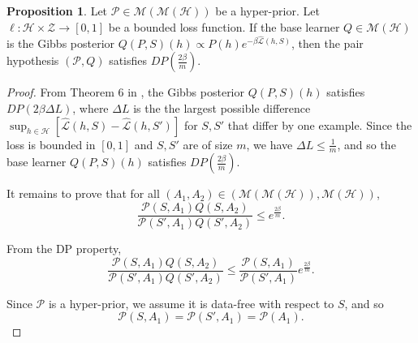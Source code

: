 \documentclass{article} %
\theoremstyle{definition}
\newtheorem{proposition}[theorem]{Proposition}
\begin{document}
\begin{proposition} \label{thm:pair-is-dp-appendix}
	Let $\mathcal{P}\in \mathcal{M}(\mathcal{M}(\mathcal{H}))$ be a hyper-prior.
	Let $\ell:\mathcal{H}\times \mathcal{Z}\rightarrow [0,1]$ be a bounded loss function. If the base learner $Q\in \mathcal{M}(\mathcal{H})$ is the Gibbs posterior $Q(P, S)(h)\propto P(h)e^{-\beta\hat{\mathcal{L}}(h, S)}$, 
	then the pair hypothesis $(\mathcal{P}, Q)$ satisfies $DP\left (\frac{2\beta}{m}\right )$.
\end{proposition}

\begin{proof}
	From Theorem 6 in \citet{McSherry2007}, the Gibbs posterior $Q(P, S)(h)$ satisfies $DP\left (2\beta\Delta L\right )$, where $\Delta L$ is the the largest possible difference  $\sup_{h\in\mathcal{H}}[\hat{\mathcal{L}}(h,S)-\hat{\mathcal{L}}(h,S')]$ for $S,S'$ that differ by one example. Since the loss is bounded in $[0,1]$ and $S,S'$ are of size $m$, we have $\Delta L\leq \frac{1}{m}$, and so the base learner $Q(P, S)(h)$ satisfies $DP\left (\frac{2\beta}{m}\right )$.
	
	It remains to prove that for all $(A_1,A_2)\in (\mathcal{M}(\mathcal{M}(\mathcal{H})), \mathcal{M}(\mathcal{H}))$, 
	$$ \frac{\mathcal{P}(S, A_1)Q(S,A_2)}{\mathcal{P}(S', A_1)Q(S',A_2)}\leq e^{\frac{2\beta}{m}} .$$
	
	From the DP property, 
%	
	$$ \frac{\mathcal{P}(S, A_1)Q(S,A_2)}{\mathcal{P}(S', A_1)Q(S',A_2)}\leq \frac{\mathcal{P}(S, A_1)}{\mathcal{P}(S', A_1)}e^{\frac{2\beta}{m}} .$$
	
	Since $\mathcal{P}$ is a hyper-prior, we assume it is data-free with respect to $S$, and so 
	$$\mathcal{P}(S, A_1)=\mathcal{P}(S', A_1)=\mathcal{P}(A_1) .$$
	
\end{proof}
\end{document}

